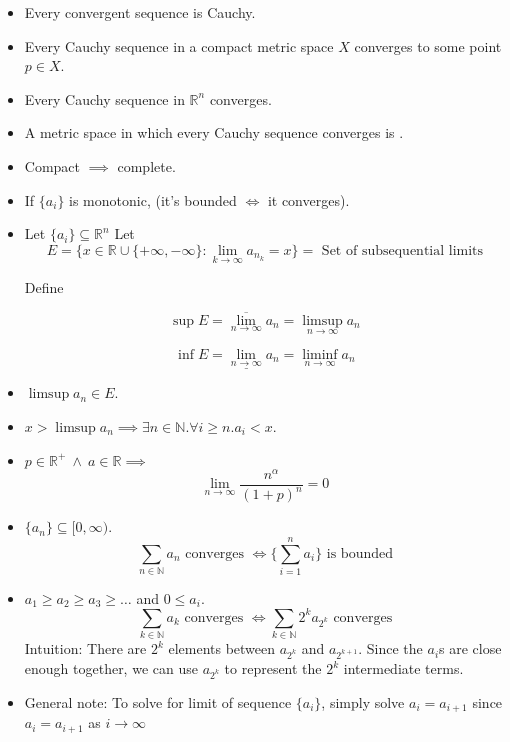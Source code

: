 \documentclass[11pt]{article}
\newcommand{\nat}{\mathbb{N}}
\newcommand{\reals}{\mathbb{R}}
\newcommand{\boxinate}[1]{\framebox[1.1\width]{#1}}
\newcommand{\tand}{~\land~}
\begin{document}
\begin{itemize}
\item Every convergent sequence is Cauchy.

\item Every Cauchy sequence in a compact metric space $X$ converges to some
  point $p \in X$.

\item Every Cauchy sequence in $\reals^n$ converges.

\item A metric space in which every Cauchy sequence converges is
  \boxinate{complete}.

\item Compact $\implies$ complete.

\item If $\{a_i\}$ is monotonic, (it's bounded $\iff$ it converges).

\item Let $\{a_i\} \subseteq \reals^n$ Let
  $$E = \{x \in \reals \cup \{+\infty, -\infty\} : \lim_{k\rightarrow \infty}
  a_{n_k} = x\} = \mbox{ Set of subsequential limits} $$

  Define

  $$\sup E = \overline{\lim_{n\rightarrow\infty}} a_n = \limsup_{n\rightarrow
    \infty} a_n$$ 

  $$\inf E = \underline{\lim_{n\rightarrow\infty}} a_n = \liminf_{n\rightarrow
    \infty} a_n$$

\item $\limsup a_n \in E$.

\item $x > \limsup a_n \implies \exists n \in \nat . \forall i \geq n . a_i <
  x$.

\item $p \in \reals^+ \tand a \in \reals \implies$
  $$\lim_{n \rightarrow \infty} \frac{n^\alpha}{(1+p)^n} = 0$$

\item $\{a_n\} \subseteq [0, \infty)$.
  $$\sum_{n \in \nat} a_n\text{ converges }\iff \{\sum_{i=1}^n a_i\} \text{ is
    bounded}$$

\item $a_1 \geq a_2 \geq a_3 \geq \ldots$ and $0 \leq a_i$.
  $$\sum_{k \in \nat} a_k \text{ converges } \iff \sum_{k \in \nat} 2^k a_{2^k}
  \text{ converges}$$
  Intuition: There are $2^k$ elements between $a_{2^k}$ and $a_{2^{k+1}}$. Since
  the $a_i$s are close enough together, we can use $a_{2^k}$ to represent the
  $2^k$ intermediate terms.

\item General note: To solve for limit of sequence $\{ a_i \}$, simply solve
  $a_i = a_{i+1}$ since $a_i = a_{i+1}$ as $i \to \infty$

\end{itemize}
\end{document}
